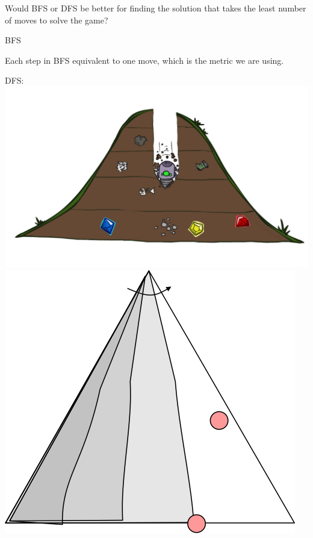 \begin{blocksection}
\question Would BFS or DFS be better for finding the solution that takes the
least number of moves to solve the game?

\begin{solution}[0.25in]
BFS

Each step in BFS equivalent to one move, which is the metric we are using.

DFS:
\includegraphics[scale=0.30]{dfs.png}
\includegraphics[scale=0.5]{dfs-triangle.png}


\end{solution}
\end{blocksection}
